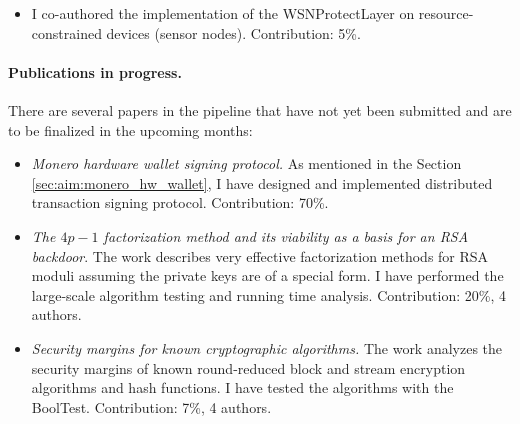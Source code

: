 \documentclass[
  digital, %
  twoside, %
  table,   %
  lof,     %
  lot,     %
]{fithesis3}
\newcounter{ph4_show_guides}
\theoremstyle{definition}
\theoremstyle{remark}
\begin{document}
\begin{itemize}
	\item {}
	I co-authored the implementation of the WSNProtectLayer on resource-constrained devices (sensor nodes). Contribution: 5\%.
\end{itemize}

\paragraph{Publications in progress.} There are several papers in the pipeline that have not yet been submitted and are to be finalized in the upcoming months:

\begin{itemize}
	\item \emph{Monero hardware wallet signing protocol.} As mentioned in the Section \ref{sec:aim:monero_hw_wallet}, I have designed and implemented distributed transaction signing protocol. Contribution: 70\%.
	
	\item \emph{The $4p-1$ factorization method and its viability as a basis for an RSA backdoor}. The work describes very effective factorization methods for RSA moduli assuming the private keys are of a special form. I have performed the large-scale algorithm testing and running time analysis. Contribution: 20\%, 4 authors.
	
	\item \emph{Security margins for known cryptographic algorithms.} The work analyzes the security margins of known round-reduced block and stream encryption algorithms and hash functions. I have tested the algorithms with the BoolTest. Contribution: 7\%, 4 authors.
\end{itemize}

%	
%	
%	
\end{document}
